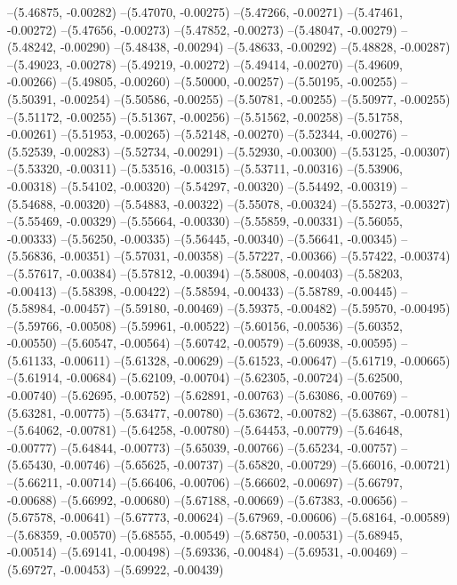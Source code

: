 --(5.46875, -0.00282)
--(5.47070, -0.00275)
--(5.47266, -0.00271)
--(5.47461, -0.00272)
--(5.47656, -0.00273)
--(5.47852, -0.00273)
--(5.48047, -0.00279)
--(5.48242, -0.00290)
--(5.48438, -0.00294)
--(5.48633, -0.00292)
--(5.48828, -0.00287)
--(5.49023, -0.00278)
--(5.49219, -0.00272)
--(5.49414, -0.00270)
--(5.49609, -0.00266)
--(5.49805, -0.00260)
--(5.50000, -0.00257)
--(5.50195, -0.00255)
--(5.50391, -0.00254)
--(5.50586, -0.00255)
--(5.50781, -0.00255)
--(5.50977, -0.00255)
--(5.51172, -0.00255)
--(5.51367, -0.00256)
--(5.51562, -0.00258)
--(5.51758, -0.00261)
--(5.51953, -0.00265)
--(5.52148, -0.00270)
--(5.52344, -0.00276)
--(5.52539, -0.00283)
--(5.52734, -0.00291)
--(5.52930, -0.00300)
--(5.53125, -0.00307)
--(5.53320, -0.00311)
--(5.53516, -0.00315)
--(5.53711, -0.00316)
--(5.53906, -0.00318)
--(5.54102, -0.00320)
--(5.54297, -0.00320)
--(5.54492, -0.00319)
--(5.54688, -0.00320)
--(5.54883, -0.00322)
--(5.55078, -0.00324)
--(5.55273, -0.00327)
--(5.55469, -0.00329)
--(5.55664, -0.00330)
--(5.55859, -0.00331)
--(5.56055, -0.00333)
--(5.56250, -0.00335)
--(5.56445, -0.00340)
--(5.56641, -0.00345)
--(5.56836, -0.00351)
--(5.57031, -0.00358)
--(5.57227, -0.00366)
--(5.57422, -0.00374)
--(5.57617, -0.00384)
--(5.57812, -0.00394)
--(5.58008, -0.00403)
--(5.58203, -0.00413)
--(5.58398, -0.00422)
--(5.58594, -0.00433)
--(5.58789, -0.00445)
--(5.58984, -0.00457)
--(5.59180, -0.00469)
--(5.59375, -0.00482)
--(5.59570, -0.00495)
--(5.59766, -0.00508)
--(5.59961, -0.00522)
--(5.60156, -0.00536)
--(5.60352, -0.00550)
--(5.60547, -0.00564)
--(5.60742, -0.00579)
--(5.60938, -0.00595)
--(5.61133, -0.00611)
--(5.61328, -0.00629)
--(5.61523, -0.00647)
--(5.61719, -0.00665)
--(5.61914, -0.00684)
--(5.62109, -0.00704)
--(5.62305, -0.00724)
--(5.62500, -0.00740)
--(5.62695, -0.00752)
--(5.62891, -0.00763)
--(5.63086, -0.00769)
--(5.63281, -0.00775)
--(5.63477, -0.00780)
--(5.63672, -0.00782)
--(5.63867, -0.00781)
--(5.64062, -0.00781)
--(5.64258, -0.00780)
--(5.64453, -0.00779)
--(5.64648, -0.00777)
--(5.64844, -0.00773)
--(5.65039, -0.00766)
--(5.65234, -0.00757)
--(5.65430, -0.00746)
--(5.65625, -0.00737)
--(5.65820, -0.00729)
--(5.66016, -0.00721)
--(5.66211, -0.00714)
--(5.66406, -0.00706)
--(5.66602, -0.00697)
--(5.66797, -0.00688)
--(5.66992, -0.00680)
--(5.67188, -0.00669)
--(5.67383, -0.00656)
--(5.67578, -0.00641)
--(5.67773, -0.00624)
--(5.67969, -0.00606)
--(5.68164, -0.00589)
--(5.68359, -0.00570)
--(5.68555, -0.00549)
--(5.68750, -0.00531)
--(5.68945, -0.00514)
--(5.69141, -0.00498)
--(5.69336, -0.00484)
--(5.69531, -0.00469)
--(5.69727, -0.00453)
--(5.69922, -0.00439)
